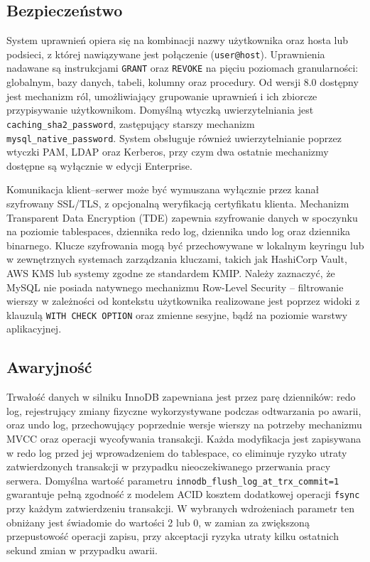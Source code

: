 \subsection{Bezpieczeństwo}

System uprawnień opiera się na kombinacji nazwy użytkownika oraz hosta lub
podsieci, z której nawiązywane jest połączenie (\texttt{user@host}). Uprawnienia
nadawane są instrukcjami \texttt{GRANT} oraz \texttt{REVOKE} na pięciu poziomach
granularności: globalnym, bazy danych, tabeli, kolumny oraz procedury. Od wersji
8.0 dostępny jest mechanizm ról, umożliwiający grupowanie uprawnień i ich
zbiorcze przypisywanie użytkownikom. Domyślną wtyczką uwierzytelniania jest
\texttt{caching\_sha2\_password}, zastępujący starszy mechanizm
\texttt{mysql\_native\_password}. System obsługuje również uwierzytelnianie
poprzez wtyczki PAM, LDAP oraz Kerberos, przy czym dwa ostatnie mechanizmy
dostępne są wyłącznie w edycji Enterprise.

Komunikacja klient–serwer może być wymuszana wyłącznie przez kanał szyfrowany
SSL/TLS, z opcjonalną weryfikacją certyfikatu klienta. Mechanizm Transparent
Data Encryption (TDE) zapewnia szyfrowanie danych w spoczynku na poziomie
tablespaces, dziennika redo log, dziennika undo log oraz dziennika binarnego.
Klucze szyfrowania mogą być przechowywane w lokalnym keyringu lub w zewnętrznych
systemach zarządzania kluczami, takich jak HashiCorp Vault, AWS KMS lub systemy
zgodne ze standardem KMIP. Należy zaznaczyć, że MySQL nie posiada natywnego
mechanizmu Row-Level Security -- filtrowanie wierszy w zależności od kontekstu
użytkownika realizowane jest poprzez widoki z klauzulą \texttt{WITH CHECK
OPTION} oraz zmienne sesyjne, bądź na poziomie warstwy aplikacyjnej.

\subsection{Awaryjność}

Trwałość danych w silniku InnoDB zapewniana jest przez parę dzienników:
redo log, rejestrujący zmiany fizyczne wykorzystywane podczas odtwarzania
po awarii, oraz undo log, przechowujący poprzednie wersje wierszy na potrzeby
mechanizmu MVCC oraz operacji wycofywania transakcji. Każda modyfikacja jest
zapisywana w redo log przed jej wprowadzeniem do tablespace, co eliminuje
ryzyko utraty zatwierdzonych transakcji w przypadku nieoczekiwanego przerwania
pracy serwera. Domyślna wartość parametru
\texttt{innodb\_flush\_log\_at\_trx\_commit=1} gwarantuje pełną zgodność
z modelem ACID kosztem dodatkowej operacji \texttt{fsync} przy każdym
zatwierdzeniu transakcji. W wybranych wdrożeniach parametr ten obniżany
jest świadomie do wartości 2 lub 0, w zamian za zwiększoną przepustowość
operacji zapisu, przy akceptacji ryzyka utraty kilku ostatnich sekund
zmian w przypadku awarii.

